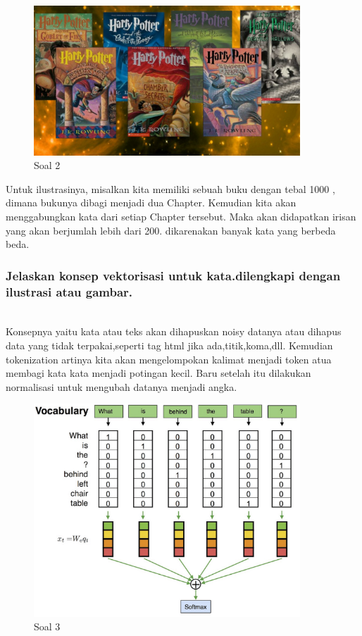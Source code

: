 	\begin{figure}[H]
		\begin{center}
		 \includegraphics[width=10cm]{figures/1174076/figures5/teori2.png}
		 \caption{Soal 2}	
		\end{center}
	\end{figure}
	
	Untuk ilustrasinya, misalkan kita memiliki sebuah buku dengan tebal 1000 , dimana bukunya dibagi menjadi dua Chapter. Kemudian kita akan menggabungkan kata dari setiap Chapter tersebut. Maka akan didapatkan irisan yang akan berjumlah lebih dari 200. dikarenakan banyak kata yang berbeda beda.


	\subsubsection{Jelaskan konsep vektorisasi untuk kata.dilengkapi dengan ilustrasi atau gambar.}
	\hfill\\
	Konsepnya yaitu kata atau teks akan dihapuskan noisy datanya atau dihapus data yang tidak terpakai,seperti tag html jika ada,titik,koma,dll. Kemudian tokenization artinya kita akan mengelompokan kalimat menjadi token atua membagi kata kata menjadi potingan kecil. Baru setelah itu dilakukan normalisasi untuk mengubah datanya menjadi angka.

	\begin{figure}[H]
		\begin{center}
		 \includegraphics[width=10cm]{figures/1174076/figures5/teori1.png}
		 \caption{Soal 3}	
		\end{center}
	\end{figure}
	
